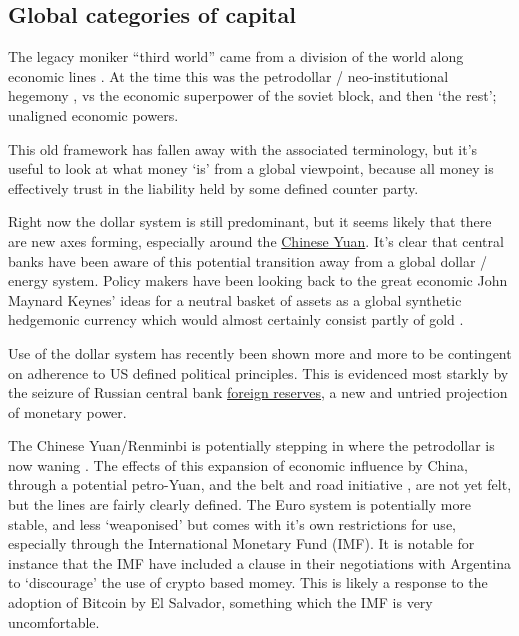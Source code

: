 \subsection{Global categories of capital}
The legacy moniker ``third world'' came from a division of the world along economic lines \cite{tomlinson2003third}. At the time this was the petrodollar / neo-institutional hegemony \cite{caballero2008financial, spiro2019hidden}, vs the economic superpower of the soviet block, and then `the rest'; unaligned economic powers.\par
This old framework has fallen away with the associated terminology, but it's useful to look at what money `is' from a global viewpoint, because all money is effectively trust in the liability held by some defined counter party.\par
Right now the dollar system is still predominant, but it seems likely that there are new axes forming, especially around the \href{https://www.wsj.com/articles/saudi-arabia-considers-accepting-yuan-instead-of-dollars-for-chinese-oil-sales-11647351541}{Chinese Yuan}. It's clear that central banks have been aware of this potential transition away from a global dollar / energy system. Policy makers have been looking back to the great economic John Maynard Keynes' ideas for a neutral basket of assets as a global synthetic hedgemonic currency \cite{carney2019growing, piffaretti2009reshaping} which would almost certainly consist partly of gold \cite{stoeferle2018gold}.\par
Use of the dollar system has recently been shown more and more to be contingent on adherence to US defined political principles. This is evidenced most starkly by the seizure of Russian central bank \href{https://twitter.com/RussianEmbassy/status/1504530573527760909}{foreign reserves}, a new and untried projection of monetary power.\par  
The Chinese Yuan/Renminbi is potentially stepping in where the petrodollar is now waning \cite{mathews2018china}. The effects of this expansion of economic influence by China, through a potential petro-Yuan, and the belt and road initiative \cite{huang2016understanding}, are not yet felt, but the lines are fairly clearly defined. The Euro system is potentially more stable, and less `weaponised' but comes with it's own restrictions for use, especially through the International Monetary Fund (IMF). It is notable for instance that the IMF have included a clause in their negotiations with Argentina to `discourage' the use of crypto based momey. This is likely a response to the adoption of Bitcoin by El Salvador, something which the IMF is very uncomfortable. \par
